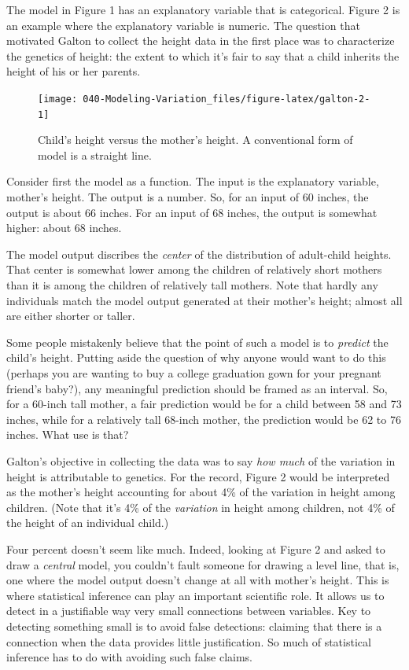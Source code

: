 \documentclass[]{book}
\begin{document}
The model in Figure 1 has an explanatory variable that is categorical. Figure 2 is an example where the explanatory variable is numeric. The question that motivated Galton to collect the height data in the first place was to characterize the genetics of height: the extent to which it's fair to say that a child inherits the height of his or her parents.

\begin{figure}\texttt{[image: 040-Modeling-Variation\_files/figure-latex/galton-2-1]} \caption{Child's height versus the mother's height. A conventional form of model is a straight line.}\label{fig:galton-2}
\end{figure}

Consider first the model as a function. The input is the explanatory variable, mother's height. The output is a number. So, for an input of 60 inches, the output is about 66 inches. For an input of 68 inches, the output is somewhat higher: about 68 inches.

The model output discribes the \emph{center} of the distribution of adult-child heights. That center is somewhat lower among the children of relatively short mothers than it is among the children of relatively tall mothers. Note that hardly any individuals match the model output generated at their mother's height; almost all are either shorter or taller.

Some people mistakenly believe that the point of such a model is to \emph{predict} the child's height. Putting aside the question of why anyone would want to do this (perhaps you are wanting to buy a college graduation gown for your pregnant friend's baby?), any meaningful prediction should be framed as an interval. So, for a 60-inch tall mother, a fair prediction would be for a child between 58 and 73 inches, while for a relatively tall 68-inch mother, the prediction would be 62 to 76 inches. What use is that?

Galton's objective in collecting the data was to say \emph{how much} of the variation in height is attributable to genetics. For the record, Figure 2 would be interpreted as the mother's height accounting for about 4\% of the variation in height among children. (Note that it's 4\% of the \emph{variation} in height among children, not 4\% of the height of an individual child.)

Four percent doesn't seem like much. Indeed, looking at Figure 2 and asked to draw a \emph{central} model, you couldn't fault someone for drawing a level line, that is, one where the model output doesn't change at all with mother's height. This is where statistical inference can play an important scientific role. It allows us to detect in a justifiable way very small connections between variables. Key to detecting something small is to avoid false detections: claiming that there is a connection when the data provides little justification. So much of statistical inference has to do with avoiding such false claims.
\end{document}
